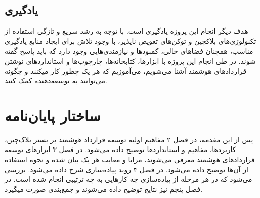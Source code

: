 \subsection{یادگیری}
هدف دیگر انجام این پروژه یادگیری است.
با توجه به رشد سریع و تازگی استفاده از تکنولوژی‌های بلاکچین و توکن‌های تعویض ناپذیر،
با وجود تلاش برای ایجاد منابع یادگیری مناسب، همچنان فضاهای خالی، کمبودها و نیازمندی‌هایی وجود دارد که باید پاسخ گفته شوند.
در طی انجام این پروژه با ابزارها، کتابخانه‌ها، چارچوب‌ها و استانداردهای نوشتن قراردادهای هوشمند آشنا می‌شویم،
می‌آموزیم که هر یک چطور کار میکنند و چگونه می‌توانند به توسعه‌دهنده کمک کنند.

\section{ساختار پایان‌نامه}
پس از این مقدمه، در فصل ۲ مفاهیم اولیه توسعه قرارداد هوشمند بر بستر بلاک‌چین، کاربردها، مفاهیم و استاندارد‌ها توضیح داده می‌شود.
در فصل ۳ ابزار‌های توسعه قرارداد‌های هوشمند معرفی می‌شوند،
مزایا و معایب هر یک بیان شده و نحوه استفاده از آن‌ها توضیح داده می‌شود.
در فصل ۴ روند پیاده‌سازی شرح داده می‌شود. بررسی می‌شود که در هر مرحله از پیاده‌سازی چه کارهایی به چه ترتیبی انجام شده است.
در فصل پنجم نیز نتایج توضیح داده می‌شوند و جمع‌بندی صورت میگیرد.
